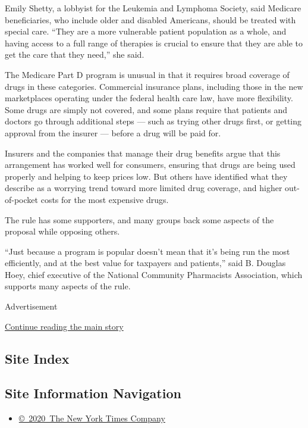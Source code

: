 Emily Shetty, a lobbyist for the Leukemia and Lymphoma Society, said
Medicare beneficiaries, who include older and disabled Americans, should
be treated with special care. ``They are a more vulnerable patient
population as a whole, and having access to a full range of therapies is
crucial to ensure that they are able to get the care that they need,''
she said.

The Medicare Part D program is unusual in that it requires broad
coverage of drugs in these categories. Commercial insurance plans,
including those in the new marketplaces operating under the federal
health care law, have more flexibility. Some drugs are simply not
covered, and some plans require that patients and doctors go through
additional steps --- such as trying other drugs first, or getting
approval from the insurer --- before a drug will be paid for.

Insurers and the companies that manage their drug benefits argue that
this arrangement has worked well for consumers, ensuring that drugs are
being used properly and helping to keep prices low. But others have
identified what they describe as a worrying trend toward more limited
drug coverage, and higher out-of-pocket costs for the most expensive
drugs.

The rule has some supporters, and many groups back some aspects of the
proposal while opposing others.

``Just because a program is popular doesn't mean that it's being run the
most efficiently, and at the best value for taxpayers and patients,''
said B. Douglas Hoey, chief executive of the National Community
Pharmacists Association, which supports many aspects of the rule.

Advertisement

\protect\hyperlink{after-bottom}{Continue reading the main story}

\hypertarget{site-index}{%
\subsection{Site Index}\label{site-index}}

\hypertarget{site-information-navigation}{%
\subsection{Site Information
Navigation}\label{site-information-navigation}}

\begin{itemize}
\tightlist
\item
  \href{https://help.nytimes.com/hc/en-us/articles/115014792127-Copyright-notice}{©~2020~The
  New York Times Company}
\end{itemize}


